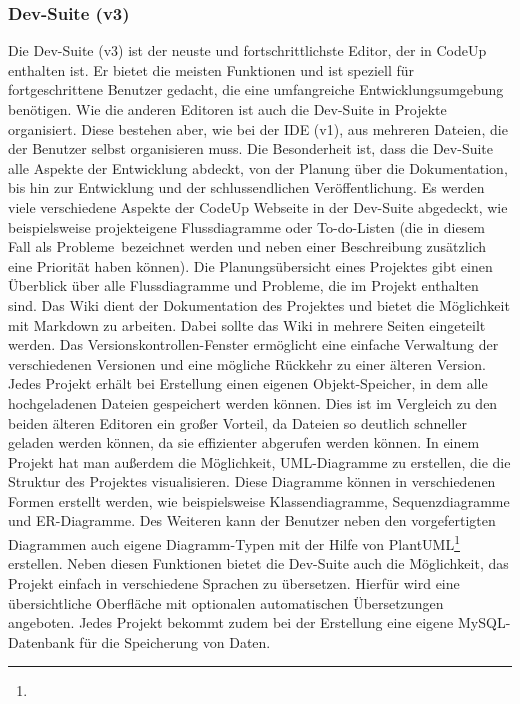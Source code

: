 \documentclass[main.tex]{subfiles}
\begin{document}
    \subsubsection{Dev-Suite (v3)}
    Die Dev-Suite (v3) ist der neuste und fortschrittlichste Editor, der in CodeUp enthalten ist.
    Er bietet die meisten Funktionen und ist speziell für fortgeschrittene Benutzer gedacht, die eine umfangreiche Entwicklungsumgebung benötigen.
    Wie die anderen Editoren ist auch die Dev-Suite in Projekte organisiert.
    Diese bestehen aber, wie bei der IDE (v1), aus mehreren Dateien, die der Benutzer selbst organisieren muss.
    Die Besonderheit ist, dass die Dev-Suite alle Aspekte der Entwicklung abdeckt, von der Planung über die Dokumentation, bis hin zur Entwicklung und der schlussendlichen Veröffentlichung.
    Es werden viele verschiedene Aspekte der CodeUp Webseite in der Dev-Suite abgedeckt, wie beispielsweise projekteigene Flussdiagramme oder To-do-Listen (die in diesem Fall als \dq Probleme\dq\ bezeichnet werden und neben einer Beschreibung zusätzlich eine Priorität haben können).
    Die Planungsübersicht eines Projektes gibt einen Überblick über alle Flussdiagramme und Probleme, die im Projekt enthalten sind.
    Das Wiki dient der Dokumentation des Projektes und bietet die Möglichkeit mit Markdown zu arbeiten.
    Dabei sollte das Wiki in mehrere Seiten eingeteilt werden.
    Das Versionskontrollen-Fenster ermöglicht eine einfache Verwaltung der verschiedenen Versionen und eine mögliche Rückkehr zu einer älteren Version.
    Jedes Projekt erhält bei Erstellung einen eigenen Objekt-Speicher, in dem alle hochgeladenen Dateien gespeichert werden können.
    Dies ist im Vergleich zu den beiden älteren Editoren ein großer Vorteil, da Dateien so deutlich schneller geladen werden können, da sie effizienter abgerufen werden können.
    In einem Projekt hat man außerdem die Möglichkeit, UML-Diagramme zu erstellen, die die Struktur des Projektes visualisieren.
    Diese Diagramme können in verschiedenen Formen erstellt werden, wie beispielsweise Klassendiagramme, Sequenzdiagramme und ER-Diagramme.
    Des Weiteren kann der Benutzer neben den vorgefertigten Diagrammen auch eigene Diagramm-Typen mit der Hilfe von PlantUML\footnote{} erstellen.
    Neben diesen Funktionen bietet die Dev-Suite auch die Möglichkeit, das Projekt einfach in verschiedene Sprachen zu übersetzen.
    Hierfür wird eine übersichtliche Oberfläche mit optionalen automatischen Übersetzungen angeboten.
    Jedes Projekt bekommt zudem bei der Erstellung eine eigene MySQL-Datenbank für die Speicherung von Daten.
\end{document}
